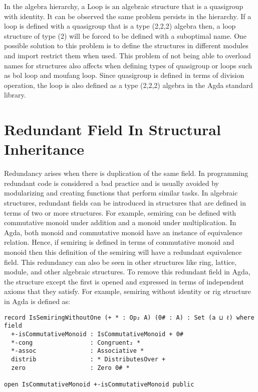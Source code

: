 In the algebra hierarchy, a Loop is an algebraic structure that is a quasigroup
with identity. It can be observed the same problem persists in the hierarchy. If
a loop is defined with a quasigroup that is a type (2,2,2) algebra then, a loop
structure of type (2) will be forced to be defined with a suboptimal name. One
possible solution to this problem is to define the structures in different
modules and import restrict them when used. This problem of not being able to
overload names for structures also affects when defining types of quasigroup or
loops such as bol loop and moufang loop. Since quasigroup is defined in terms of
division operation, the loop is also defined as a type (2,2,2) algebra in the Agda
standard library.

\section{Redundant Field In Structural Inheritance}
Redundancy arises when there is duplication of the same field. In programming
redundant code is considered a bad practice and is usually avoided by
modularizing and creating functions that perform similar tasks. In algebraic
structures, redundant fields can be introduced in structures that are defined in
terms of two or more structures. For example, semiring can be defined with
commutative monoid under addition and a monoid under multiplication. In Agda,
both monoid and commutative monoid have an instance of equivalence relation.
Hence, if semiring is defined in terms of commutative monoid and monoid then
this definition of the semiring will have a redundant equivalence field. This
redundancy can also be seen in other structures like ring, lattice, module, and
other algebraic structures. To remove this redundant field in Agda, the
structure except the first is opened and expressed in terms of independent
axioms that they satisfy. For example, semiring without identity or rig
structure in Agda is defined as:

\begin{verbatim}
record IsSemiringWithoutOne (+ * : Op₂ A) (0# : A) : Set (a ⊔ ℓ) where
field
  +-isCommutativeMonoid : IsCommutativeMonoid + 0#
  *-cong                : Congruent₂ *
  *-assoc               : Associative *
  distrib               : * DistributesOver +
  zero                  : Zero 0# *

open IsCommutativeMonoid +-isCommutativeMonoid public
\end{verbatim}

